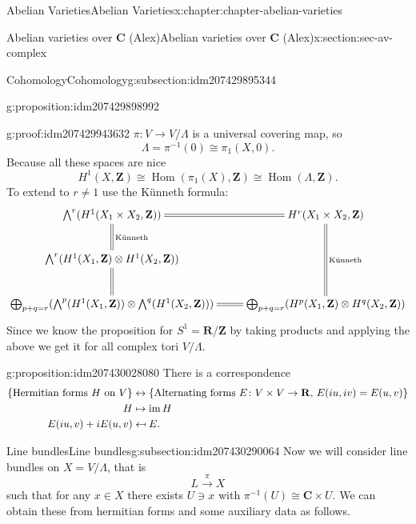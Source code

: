 \documentclass[oneside,10pt,]{book}
\numberwithin{equation}{section}
\providecommand\mapsfrom{\mathrel{\reflectbox{\ensuremath{\mapsto}}}}
\newcommand{\ZZ}{\mathbf{Z}}
\newcommand{\RR}{\mathbf{R}}
\newcommand{\CC}{\mathbf{C}}
\DeclareMathOperator{\Hom}{Hom}
\DeclareMathOperator{\im}{im}
\newcommand{\amp}{&}
\begin{document}
\begin{chapterptx}{Abelian Varieties}{}{Abelian Varieties}{}{}{x:chapter:chapter-abelian-varieties}
\begin{sectionptx}{Abelian varieties over \(\CC\) (Alex)}{}{Abelian varieties over \(\CC\) (Alex)}{}{}{x:section:sec-av-complex}
\begin{subsectionptx}{Cohomology}{}{Cohomology}{}{}{g:subsection:idm207429895344}
\begin{proposition}{}{}{g:proposition:idm207429898992}
%
\end{proposition}
\begin{proofptx}{}{g:proof:idm207429943632}
\(\pi\colon V\to V/\Lambda\) is a universal covering map, so%
\begin{equation*}
\Lambda = \pi^{-1} (0 ) \cong \pi_1(X,0)\text{.}
\end{equation*}
Because all these spaces are nice%
\begin{equation*}
H^1 (X,\ZZ) \cong \Hom(\pi_1(X), \ZZ) \cong \Hom(\Lambda, \ZZ)\text{.}
\end{equation*}
To extend to \(r \ne 1\) use the Künneth formula:%
\begin{equation*}
\xymatrix{
\bigwedge^r(H^1(X_1\times X_2, \ZZ)) \ar@{=}[r]\ar@{=}[d]^{\text{Künneth}} & H^r(X_1\times X_2 , \ZZ)\ar@{=}[dd]^{\text{Künneth}}\\
\bigwedge^r(H^1(X_1, \ZZ)\otimes H^1(X_2, \ZZ)) \ar@{=}[d]& \\
\bigoplus_{p+q=r}(\bigwedge^p(H^1(X_1, \ZZ))\otimes\bigwedge^q(H^1(X_2, \ZZ))) \ar@{=}[r] & \bigoplus_{p+q=r}(H^p(X_1, \ZZ)\otimes H^q(X_2, \ZZ))
}
\end{equation*}
Since we know the proposition for \(S^1 = \RR/\ZZ\) by taking products and applying the above we get it for all complex tori \(V/\Lambda\).%
\end{proofptx}
\begin{proposition}{}{}{g:proposition:idm207430028080}%
There is a correspondence%
\begin{align*}
\{\text{Hermitian forms }H \text{ on } V\} \amp\leftrightarrow\{\text{Alternating forms }E\colon V\times V\to\RR,\,E(iu,iv) = E(u,v)\}\\
H\amp\mapsto \im H\\
E(iu,v)+ i E(u,v) \amp\mapsfrom E\text{.}
\end{align*}
%
\end{proposition}
\end{subsectionptx}
%
%
\typeout{************************************************}
\typeout{************************************************}
%
\begin{subsectionptx}{Line bundles}{}{Line bundles}{}{}{g:subsection:idm207430290064}
Now we will consider line bundles on \(X = V/\Lambda\), that is%
\begin{equation*}
L\xrightarrow{\pi} X
\end{equation*}
such that for any \(x\in X\) there exists \(U\ni x\) with \(\pi^{-1} (U) \cong \CC \times U\). We can obtain these from hermitian forms and some auxiliary data as follows.%

\end{subsectionptx}
\end{sectionptx}
\end{chapterptx}
\end{document}
